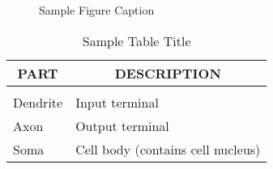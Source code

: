 \begin{figure}[h]
\vspace{1in}
\caption{Sample Figure Caption}
\end{figure}

\begin{table}[t]
\caption{Sample Table Title}
\label{sample-table}
\begin{center}
\begin{tabular}{ll}
\multicolumn{1}{c}{\bf PART}  &\multicolumn{1}{c}{\bf DESCRIPTION}
\\ \hline \\
Dendrite         &Input terminal \\
Axon             &Output terminal \\
Soma             &Cell body (contains cell nucleus) \\
\end{tabular}
\end{center}
\end{table}








